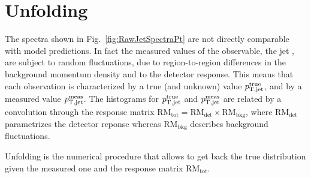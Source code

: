 \documentclass[a4paper]{jpconf}
\begin{document}
\section{Unfolding}
The spectra shown in Fig.~\ref{fig:RawJetSpectraPt} are not directly comparable with model predictions.
In fact the measured values of the observable, the jet \pT{}, are subject to random fluctuations,
due to region-to-region differences in the background momentum density and to the detector response. This means
that each observation is characterized by a true (and unknown) value $p_{\rm T,jet}^{\rm true}$,
and by a measured value $p_{\rm T,jet}^{\rm meas}$. The histograms for $p_{\rm T,jet}^{\rm true}$
and $p_{\rm T,jet}^{\rm meas}$ are related by a convolution through the response matrix 
$\mathrm{RM_{tot}} = \mathrm{RM_{det}} \times \mathrm{RM_{bkg}}$, where $\mathrm{RM_{det}}$ parametrizes
the detector reponse whereas $\mathrm{RM_{bkg}}$ describes background fluctuations.

Unfolding is the numerical procedure that allows to get back the true distribution given the 
measured one and the response matrix $\mathrm{RM_{tot}}$.
\end{document}
